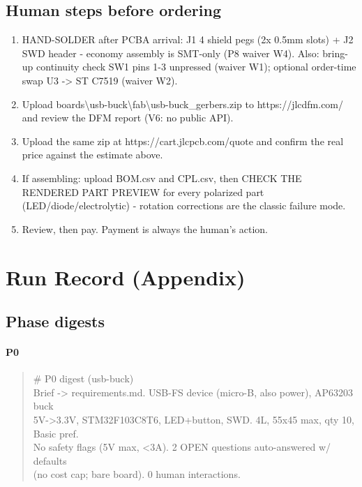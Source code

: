\documentclass[11pt,a4paper]{article}
\begin{document}
\subsection*{Human steps before ordering}
\begin{enumerate}
\item HAND-SOLDER after PCBA arrival: J1 4 shield pegs (2x 0.5mm slots) + J2 SWD header - economy assembly is SMT-only (P8 waiver W4). Also: bring-up continuity check SW1 pins 1-3 unpressed (waiver W1); optional order-time swap U3 -\textgreater{} ST C7519 (waiver W2).
\item Upload boards\textbackslash{}usb-buck\textbackslash{}fab\textbackslash{}usb-buck\_gerbers.zip to https://jlcdfm.com/ and review the DFM report (V6: no public API).
\item Upload the same zip at https://cart.jlcpcb.com/quote and confirm the real price against the estimate above.
\item If assembling: upload BOM.csv and CPL.csv, then CHECK THE RENDERED PART PREVIEW for every polarized part (LED/diode/electrolytic) - rotation corrections are the classic failure mode.
\item Review, then pay. Payment is always the human's action.
\end{enumerate}
\section{Run Record (Appendix)}
\subsection*{Phase digests}
\paragraph*{P0}
\begin{quote}\small\ttfamily\raggedright
\# P0 digest (usb-buck)\\
Brief -\textgreater{} requirements.md. USB-FS device (micro-B, also power), AP63203 buck\\
5V-\textgreater{}3.3V, STM32F103C8T6, LED+button, SWD. 4L, 55x45 max, qty 10, Basic pref.\\
No safety flags (5V max, \textless{}3A). 2 OPEN questions auto-answered w/ defaults\\
(no cost cap; bare board). 0 human interactions.
\end{quote}
\end{document}
